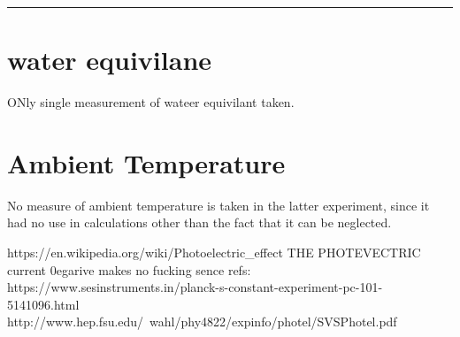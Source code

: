 \documentclass[%
 sor,
 jor,
 amsmath,amssymb,
 reprint,%
]{revtex4-2}
\begin{document}
\noindent\rule{\linewidth}{0.4pt}
\vspace{2cm}
\appendix
\section{water equivilane}\label{appendix:prevexp}
ONly single measurement of wateer equivilant taken.
\section{Ambient Temperature}
No measure of ambient temperature is taken in the latter experiment, since it had no use in calculations other than the fact that it can be neglected. 


https://en.wikipedia.org/wiki/Photoelectric_effect THE PHOTEVECTRIC current 0egarive makes no fucking sence
refs: https://www.sesinstruments.in/planck-s-constant-experiment-pc-101-5141096.html
http://www.hep.fsu.edu/~wahl/phy4822/expinfo/photel/SVSPhotel.pdf


\end{document}

